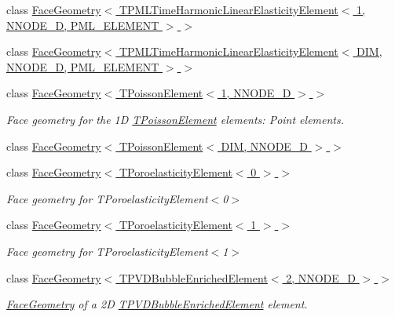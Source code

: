 \begin{DoxyCompactItemize}
\item 
class \hyperlink{classoomph_1_1FaceGeometry_3_01TPMLTimeHarmonicLinearElasticityElement_3_011_00_01NNODE__1D_00_01PML__ELEMENT_01_4_01_4}{Face\+Geometry$<$ T\+P\+M\+L\+Time\+Harmonic\+Linear\+Elasticity\+Element$<$ 1, N\+N\+O\+D\+E\+\_\+D, P\+M\+L\+\_\+\+E\+L\+E\+M\+E\+N\+T $>$ $>$}
\item 
class \hyperlink{classoomph_1_1FaceGeometry_3_01TPMLTimeHarmonicLinearElasticityElement_3_01DIM_00_01NNODE__1D_00_01PML__ELEMENT_01_4_01_4}{Face\+Geometry$<$ T\+P\+M\+L\+Time\+Harmonic\+Linear\+Elasticity\+Element$<$ D\+I\+M, N\+N\+O\+D\+E\+\_\+D, P\+M\+L\+\_\+\+E\+L\+E\+M\+E\+N\+T $>$ $>$}
\item 
class \hyperlink{classoomph_1_1FaceGeometry_3_01TPoissonElement_3_011_00_01NNODE__1D_01_4_01_4}{Face\+Geometry$<$ T\+Poisson\+Element$<$ 1, N\+N\+O\+D\+E\+\_\+D $>$ $>$}
\begin{DoxyCompactList}\small\item\em Face geometry for the 1D \hyperlink{classoomph_1_1TPoissonElement}{T\+Poisson\+Element} elements\+: Point elements. \end{DoxyCompactList}\item 
class \hyperlink{classoomph_1_1FaceGeometry_3_01TPoissonElement_3_01DIM_00_01NNODE__1D_01_4_01_4}{Face\+Geometry$<$ T\+Poisson\+Element$<$ D\+I\+M, N\+N\+O\+D\+E\+\_\+D $>$ $>$}
\item 
class \hyperlink{classoomph_1_1FaceGeometry_3_01TPoroelasticityElement_3_010_01_4_01_4}{Face\+Geometry$<$ T\+Poroelasticity\+Element$<$ 0 $>$ $>$}
\begin{DoxyCompactList}\small\item\em Face geometry for T\+Poroelasticity\+Element$<$0$>$ \end{DoxyCompactList}\item 
class \hyperlink{classoomph_1_1FaceGeometry_3_01TPoroelasticityElement_3_011_01_4_01_4}{Face\+Geometry$<$ T\+Poroelasticity\+Element$<$ 1 $>$ $>$}
\begin{DoxyCompactList}\small\item\em Face geometry for T\+Poroelasticity\+Element$<$1$>$ \end{DoxyCompactList}\item 
class \hyperlink{classoomph_1_1FaceGeometry_3_01TPVDBubbleEnrichedElement_3_012_00_01NNODE__1D_01_4_01_4}{Face\+Geometry$<$ T\+P\+V\+D\+Bubble\+Enriched\+Element$<$ 2, N\+N\+O\+D\+E\+\_\+D $>$ $>$}
\begin{DoxyCompactList}\small\item\em \hyperlink{classoomph_1_1FaceGeometry}{Face\+Geometry} of a 2D \hyperlink{classoomph_1_1TPVDBubbleEnrichedElement}{T\+P\+V\+D\+Bubble\+Enriched\+Element} element. \end{DoxyCompactList}\item 

\end{DoxyCompactItemize}
